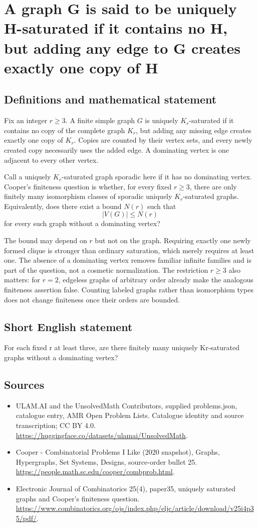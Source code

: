 \documentclass[11pt,a4paper]{article}
\begin{document}
\section*{A graph G is said to be uniquely H-saturated if it contains no H, but adding any edge to G creates exactly one copy of H}\label{statement}

\subsection{Definitions and mathematical statement}
Fix an integer $r\ge3$. A finite simple graph $G$ is uniquely
$K_r$-saturated if it contains no copy of the complete graph $K_r$,
but adding any missing edge creates exactly one copy of $K_r$.
Copies are counted by their vertex sets, and every newly created
copy necessarily uses the added edge. A dominating vertex is one
adjacent to every other vertex.

Call a uniquely $K_r$-saturated graph sporadic here if it has no
dominating vertex. Cooper's finiteness question is whether, for
every fixed $r\ge3$, there are only finitely many isomorphism
classes of sporadic uniquely $K_r$-saturated graphs. Equivalently,
does there exist a bound $N(r)$ such that
\[
          |V(G)|\le N(r)
\]
for every such graph without a dominating vertex?

The bound may depend on $r$ but not on the graph. Requiring exactly
one newly formed clique is stronger than ordinary saturation,
which merely requires at least one. The absence of a dominating
vertex removes familiar infinite families and is part of the
question, not a cosmetic normalization. The restriction $r\ge3$
also matters: for $r=2$, edgeless graphs of arbitrary order already
make the analogous finiteness assertion false. Counting labeled
graphs rather than isomorphism types does not change finiteness
once their orders are bounded.
\subsection{Short English statement}
For each fixed r at least three, are there finitely many uniquely Kr-saturated graphs without a dominating vertex?
\subsection{Sources}
\begin{itemize}
\item[S1] ULAM.AI and the UnsolvedMath Contributors, supplied problems.json, catalogue entry, AMR Open Problem Lists. Catalogue identity and source transcription; CC BY 4.0.
\url{https://huggingface.co/datasets/ulamai/UnsolvedMath}.
\item[S2] Cooper - Combinatorial Problems I Like (2020 snapshot), Graphs, Hypergraphs, Set Systems, Designs, source-order bullet 25. 
\url{https://people.math.sc.edu/cooper/combprob.html}.
\item[S3] Electronic Journal of Combinatorics 25(4), paper35, uniquely saturated graphs and Cooper’s finiteness question.
\url{https://www.combinatorics.org/ojs/index.php/eljc/article/download/v25i4p35/pdf/}.
\end{itemize}
\end{document}
